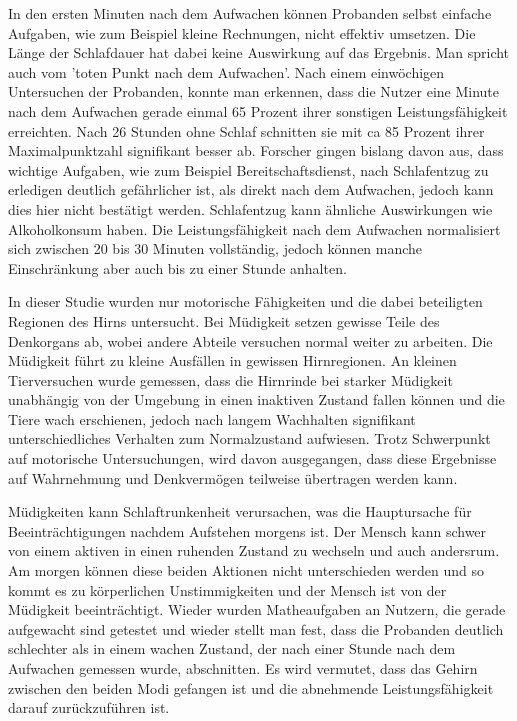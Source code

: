 In den ersten Minuten nach dem Aufwachen können Probanden selbst einfache Aufgaben, wie zum Beispiel kleine Rechnungen, nicht effektiv umsetzen. Die Länge der Schlafdauer hat dabei keine Auswirkung auf das Ergebnis. Man spricht auch vom 'toten Punkt nach dem Aufwachen'. Nach einem einwöchigen Untersuchen der Probanden, konnte man erkennen, dass die Nutzer eine Minute nach dem Aufwachen gerade einmal 65 Prozent ihrer sonstigen Leistungsfähigkeit erreichten. Nach 26 Stunden ohne Schlaf schnitten sie mit ca 85 Prozent ihrer Maximalpunktzahl signifikant besser ab. Forscher gingen bislang davon aus, dass wichtige Aufgaben, wie zum Beispiel Bereitschaftsdienst, nach Schlafentzug zu erledigen deutlich gefährlicher ist, als direkt nach dem Aufwachen, jedoch kann dies hier nicht bestätigt werden.
Schlafentzug kann ähnliche Auswirkungen wie Alkoholkonsum haben.
Die Leistungsfähigkeit nach dem Aufwachen normalisiert sich zwischen 20 bis 30 Minuten vollständig, jedoch können manche Einschränkung aber auch bis zu einer Stunde anhalten. \\

\cite{online:uebermuedetesHirn}

In dieser Studie wurden nur motorische Fähigkeiten und die dabei beteiligten Regionen des Hirns untersucht. Bei Müdigkeit setzen gewisse Teile des Denkorgans ab, wobei andere Abteile versuchen normal weiter zu arbeiten. Die Müdigkeit führt zu kleine Ausfällen in gewissen Hirnregionen. An kleinen Tierversuchen wurde gemessen, dass die Hirnrinde bei starker Müdigkeit unabhängig von der Umgebung in einen inaktiven Zustand fallen können und die Tiere wach erschienen, jedoch nach langem Wachhalten signifikant unterschiedliches Verhalten zum Normalzustand aufwiesen. Trotz Schwerpunkt auf motorische Untersuchungen, wird davon ausgegangen, dass diese Ergebnisse auf Wahrnehmung und Denkvermögen teilweise übertragen werden kann.\\

\cite{online:muede}

Müdigkeiten kann Schlaftrunkenheit verursachen, was die Hauptursache für Beeinträchtigungen nachdem Aufstehen morgens ist. Der Mensch kann schwer von einem aktiven in einen ruhenden Zustand zu wechseln und auch andersrum. Am morgen können diese beiden Aktionen nicht unterschieden werden und so kommt es zu körperlichen Unstimmigkeiten und der Mensch ist von der Müdigkeit beeinträchtigt. Wieder wurden Matheaufgaben an Nutzern, die gerade aufgewacht sind getestet und wieder stellt man fest, dass die Probanden deutlich schlechter als in einem wachen Zustand, der nach einer Stunde nach dem Aufwachen gemessen wurde, abschnitten. Es wird vermutet, dass das Gehirn zwischen den beiden Modi gefangen ist und die abnehmende Leistungsfähigkeit darauf zurückzuführen ist.\\

